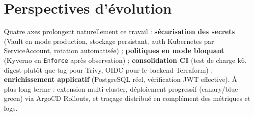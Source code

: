 \documentclass[12pt,a4paper,oneside]{report}
\makeatletter
\def\cleardoublepage{\clearpage\if@twoside
  \ifodd\c@page\else\hbox{}\thispagestyle{empty}\newpage\fi\fi}
\makeatother
\begin{document}
\section*{Perspectives d'évolution}

Quatre axes prolongent naturellement ce travail : \textbf{sécurisation des secrets} (Vault en mode production, stockage persistant, auth Kubernetes par ServiceAccount, rotation automatisée) ; \textbf{politiques en mode bloquant} (Kyverno en \texttt{Enforce} après observation) ; \textbf{consolidation CI} (test de charge k6, digest plutôt que tag pour Trivy, OIDC pour le backend Terraform) ; \textbf{enrichissement applicatif} (PostgreSQL réel, vérification JWT effective). À plus long terme : extension multi-cluster, déploiement progressif (canary/blue-green) via ArgoCD Rollouts, et traçage distribué en complément des métriques et logs.

\cleardoublepage
\end{document}
